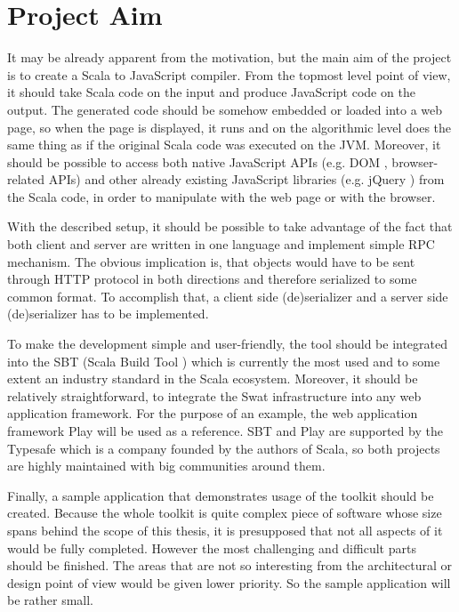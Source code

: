\documentclass[12pt,a4paper]{report}
\begin{document}
\section{Project Aim}

It may be already apparent from the motivation, but the main aim of the project is to create a Scala to JavaScript compiler. From the topmost level point of view, it should take Scala code on the input and produce JavaScript code on the output. The generated code should be somehow embedded or loaded into a web page, so when the page is displayed, it runs and on the algorithmic level does the same thing as if the original Scala code was executed on the JVM. Moreover, it should be possible to access both native JavaScript APIs (e.g. DOM \cite{Dom}, browser-related APIs) and other already existing JavaScript libraries (e.g. jQuery \cite{Jquery}) from the Scala code, in order to manipulate with the web page or with the browser.

With the described setup, it should be possible to take advantage of the fact that both client and server are written in one language and implement simple RPC mechanism. The obvious implication is, that objects would have to be sent through HTTP protocol in both directions and therefore serialized to some common format. To accomplish that, a client side (de)serializer and a server side (de)serializer has to be implemented.

To make the development simple and user-friendly, the tool should be integrated into the SBT (Scala Build Tool \cite{Sbt}) which is currently the most used and to some extent an industry standard in the Scala ecosystem. Moreover, it should be relatively straightforward, to integrate the Swat infrastructure into any web application framework. For the purpose of an example, the web application framework Play \cite{Play} will be used as a reference. SBT and Play are supported by the Typesafe \cite{Typesafe} which is a company founded by the authors of Scala, so both projects are highly maintained with big communities around them.

Finally, a sample application that demonstrates usage of the toolkit should be created. Because the whole toolkit is quite complex piece of software whose size spans behind the scope of this thesis, it is presupposed that not all aspects of it would be fully completed. However the most challenging and difficult parts should be finished. The areas that are not so interesting from the architectural or design point of view would be given lower priority. So the sample application will be rather small.
\end{document}
